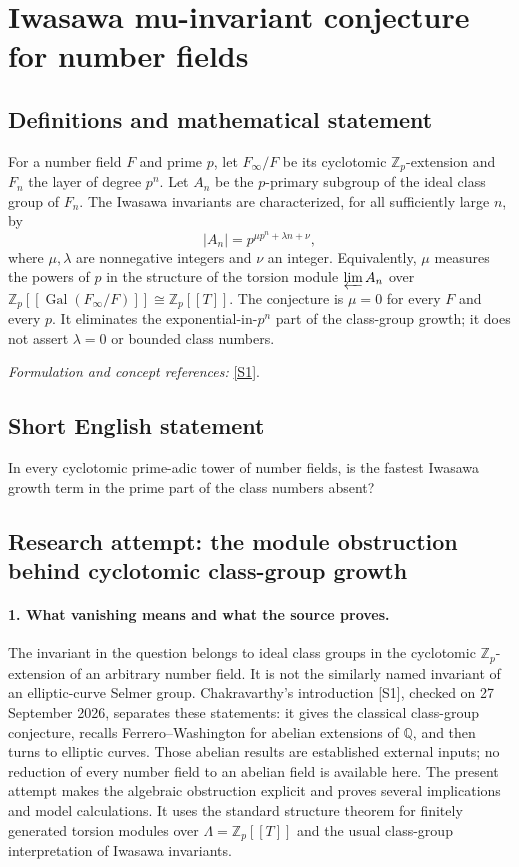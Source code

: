 \documentclass[11pt]{article}
\begin{document}
\section*{\texorpdfstring{Iwasawa mu-invariant conjecture for number fields}{Iwasawa mu-invariant conjecture for number fields}}\label{statement}
\subsection{Definitions and mathematical statement}
For a number field $F$ and prime $p$, let $F_\infty/F$ be its cyclotomic ${\mathbb{Z}}_p$-extension and $F_n$ the layer of degree $p^n$. Let $A_n$ be the $p$-primary subgroup of the ideal class group of $F_n$. The Iwasawa invariants are characterized, for all sufficiently large $n$, by
\[
 |A_n|=p^{\mu p^n+\lambda n+\nu},
\]
where $\mu,\lambda$ are nonnegative integers and $\nu$ an integer. Equivalently, $\mu$ measures the powers of $p$ in the structure of the torsion module $\varprojlim A_n$ over ${\mathbb{Z}}_p[[\operatorname{Gal}(F_\infty/F)]]\cong{\mathbb{Z}}_p[[T]]$. The conjecture is $\mu=0$ for every $F$ and every $p$. It eliminates the exponential-in-$p^n$ part of the class-group growth; it does not assert $\lambda=0$ or bounded class numbers.
\par\smallskip\textit{Formulation and concept references:} \href{https://arxiv.org/html/2408.07826v2}{[S1]}.

\subsection{Short English statement}
In every cyclotomic prime-adic tower of number fields, is the fastest Iwasawa growth term in the prime part of the class numbers absent?
\subsection{Research attempt: the module obstruction behind cyclotomic class-group growth}
\paragraph{1. What vanishing means and what the source proves.}
The invariant in the question belongs to ideal class groups in the cyclotomic $\mathbb Z_p$-extension of an arbitrary number field. It is not the similarly named invariant of an elliptic-curve Selmer group. Chakravarthy's introduction [S1], checked on 27 September 2026, separates these statements: it gives the classical class-group conjecture, recalls Ferrero--Washington for abelian extensions of $\mathbb Q$, and then turns to elliptic curves. Those abelian results are established external inputs; no reduction of every number field to an abelian field is available here. The present attempt makes the algebraic obstruction explicit and proves several implications and model calculations. It uses the standard structure theorem for finitely generated torsion modules over $\Lambda=\mathbb Z_p[[T]]$ and the usual class-group interpretation of Iwasawa invariants.
\end{document}
